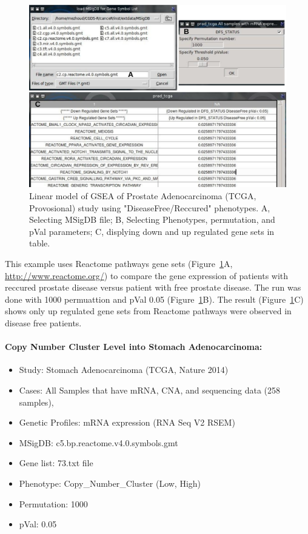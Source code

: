 \documentclass[a4paper]{article}
\begin{document}
 
 
 \begin{figure}[!ht]
  \centering
 \includegraphics[scale=2]{image/pradGSEAlm.png}
 \caption{Linear model of GSEA of Prostate Adenocarcinoma (TCGA, Provosional) study using "DiseaseFree/Reccured" phenotypes. A, Selecting MSigDB file; B, Selecting Phenotypes, permutation, and pVal parameters; C, displying down and up regulated gene sets in table.}
 \label{pradGSEAlm}
 \end{figure}
 
This example uses Reactome pathways gene sets (Figure~\ref{pradGSEAlm}A, \url{http://www.reactome.org/}) to compare the gene expression of patients with reccured prostate disease versus patient with free prostate disease. The run was done with 1000 permuattion and pVal 0.05 (Figure~\ref{pradGSEAlm}B). The result (Figure~\ref{pradGSEAlm}C) shows only up regulated gene sets from Reactome pathways were observed in disease free patients. 
 
 \paragraph{Copy Number Cluster Level into Stomach Adenocarcinoma:}

\begin{itemize}
    \item Study: Stomach Adenocarcinoma (TCGA, Nature 2014) 
    \item Cases: All Samples that have mRNA, CNA, and sequencing data (258 samples),
    \item Genetic Profiles: mRNA expression (RNA Seq V2 RSEM)
    \item MSigDB: c5.bp.reactome.v4.0.symbols.gmt
    \item Gene list: 73.txt file
    \item Phenotype: Copy\_Number\_Cluster (Low, High)
    \item Permutation: 1000
    \item pVal: 0.05
 \end{itemize}
 
\end{document}

